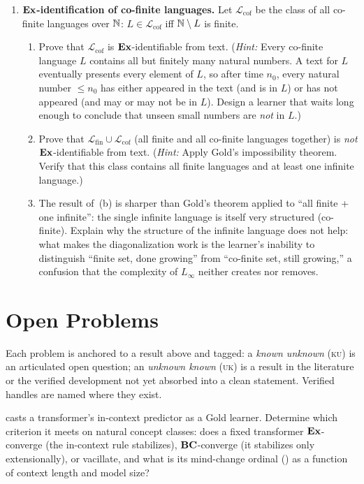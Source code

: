\begin{enumerate}[leftmargin=*,itemsep=6pt]
\item \textbf{$\mathbf{Ex}$-identification of co-finite languages.}
  Let $\mathcal{L}_{\mathrm{cof}}$ be the class of all co-finite
  languages over $\mathbb{N}$: $L \in \mathcal{L}_{\mathrm{cof}}$ iff
  $\mathbb{N} \setminus L$ is finite.
  \begin{enumerate}[label=(\alph*)]
  \item Prove that $\mathcal{L}_{\mathrm{cof}}$ is
    $\mathbf{Ex}$-identifiable from text.  (\emph{Hint:} Every co-finite
    language $L$ contains all but finitely many natural numbers.
    A text for $L$ eventually presents every element of $L$, so after
    time $n_0$, every natural number $\leq n_0$ has either appeared
    in the text (and is in $L$) or has not appeared (and may or
    may not be in $L$).  Design a learner that waits long enough
    to conclude that unseen small numbers are \emph{not} in $L$.)
  \item Prove that $\mathcal{L}_{\mathrm{fin}} \cup
    \mathcal{L}_{\mathrm{cof}}$ (all finite and all co-finite
    languages together) is \emph{not} $\mathbf{Ex}$-identifiable from text.
    (\emph{Hint:} Apply Gold's impossibility theorem.  Verify
    that this class contains all finite languages and at least one
    infinite language.)
  \item The result of~(b) is sharper than Gold's theorem applied
    to ``all finite + one infinite'': the single infinite language
    is itself very structured (co-finite).  Explain why the structure
    of the infinite language does not help: what makes the
    diagonalization work is the learner's inability to distinguish
    ``finite set, done growing'' from ``co-finite set, still
    growing,'' a confusion that the complexity of $L_\infty$ neither
    creates nor removes.
  \end{enumerate}

\end{enumerate}

\section{Open Problems}
\label{sec:ch7-open}

Each problem is anchored to a result above and tagged: a \emph{known unknown} (\textsc{ku}) is an articulated open question; an \emph{unknown known} (\textsc{uk}) is a result in the literature or the verified development not yet absorbed into a clean statement.  Verified handles are named where they exist.

\begin{openprob}
\label{op:icl-identification}
 casts a transformer's in-context predictor as a Gold learner.  Determine which criterion it meets on natural concept classes: does a fixed transformer $\mathbf{Ex}$-converge (the in-context rule stabilizes), $\mathbf{BC}$-converge (it stabilizes only extensionally), or vacillate, and what is its mind-change ordinal () as a function of context length and model size?
\end{openprob}

